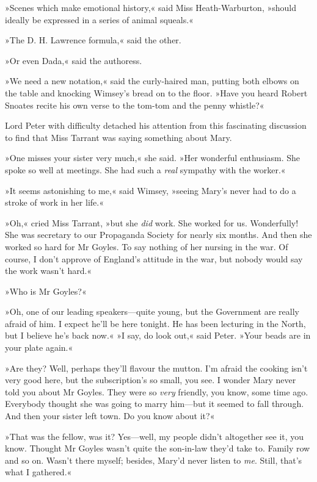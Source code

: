»Scenes which make emotional history,« said Miss Heath-Warburton, »should ideally be expressed in a series of animal squeals.«

»The D. H. Lawrence formula,« said the other.

»Or even Dada,« said the authoress.

»We need a new notation,« said the curly-haired man, putting both elbows on the table and knocking Wimsey's bread on to the floor. »Have you heard Robert Snoates recite his own verse to the tom-tom and the penny whistle?«

Lord Peter with difficulty detached his attention from this fascinating discussion to find that Miss Tarrant was saying something about Mary.

»One misses your sister very much,« she said. »Her wonderful enthusiasm. She spoke so well at meetings. She had such a \textit{real} sympathy with the worker.«

»It seems astonishing to me,« said Wimsey, »seeing Mary's never had to do a stroke of work in her life.«

»Oh,« cried Miss Tarrant, »but she \textit{did} work. She worked for us.  Wonderfully! She was secretary to our Propaganda Society for nearly six months. And then she worked so hard for Mr Goyles. To say nothing of her nursing in the war. Of course, I don't approve of England's attitude in the war, but nobody would say the work wasn't hard.«

»Who is Mr Goyles?«

»Oh, one of our leading speakers—quite young, but the Government are really afraid of him. I expect he'll be here tonight. He has been lecturing in the North, but I believe he's back now.«
»I say, do look out,« said Peter. »Your beads are in your plate again.«

»Are they? Well, perhaps they'll flavour the mutton. I'm afraid the cooking isn't very good here, but the subscription's so small, you see.  I wonder Mary never told you about Mr Goyles. They were so \textit{very} friendly, you know, some time ago. Everybody thought she was going to marry him—but it seemed to fall through. And then your sister left town. Do you know about it?«

»That was the fellow, was it? Yes—well, my people didn't altogether see it, you know. Thought Mr Goyles wasn't quite the son-in-law they'd take to. Family row and so on. Wasn't there myself; besides, Mary'd never listen to \textit{me}. Still, that's what I gathered.«


